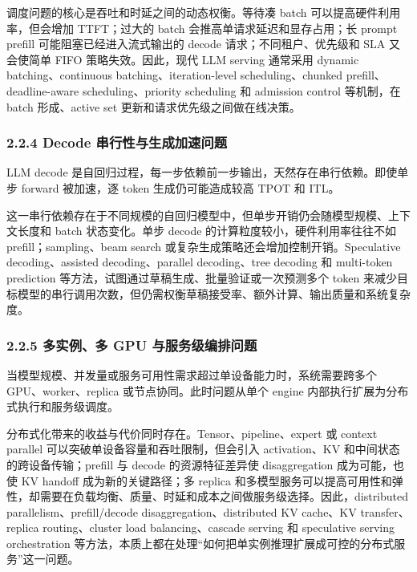 调度问题的核心是吞吐和时延之间的动态权衡。等待凑 batch 可以提高硬件利用率，但会增加 TTFT；过大的 batch 会推高单请求延迟和显存占用；长 prompt prefill 可能阻塞已经进入流式输出的 decode 请求；不同租户、优先级和 SLA 又会使简单 FIFO 策略失效。因此，现代 LLM serving 通常采用 dynamic batching、continuous batching、iteration-level scheduling、chunked prefill、deadline-aware scheduling、priority scheduling 和 admission control 等机制，在 batch 形成、active set 更新和请求优先级之间做在线决策。




\subsubsection*{2.2.4 Decode 串行性与生成加速问题}

LLM decode 是自回归过程，每一步依赖前一步输出，天然存在串行依赖。即使单步 forward 被加速，逐 token 生成仍可能造成较高 TPOT 和 ITL。

这一串行依赖存在于不同规模的自回归模型中，但单步开销仍会随模型规模、上下文长度和 batch 状态变化。单步 decode 的计算粒度较小，硬件利用率往往不如 prefill；sampling、beam search 或复杂生成策略还会增加控制开销。Speculative decoding、assisted decoding、parallel decoding、tree decoding 和 multi-token prediction 等方法，试图通过草稿生成、批量验证或一次预测多个 token 来减少目标模型的串行调用次数，但仍需权衡草稿接受率、额外计算、输出质量和系统复杂度。




\subsubsection*{2.2.5 多实例、多 GPU 与服务级编排问题}

当模型规模、并发量或服务可用性需求超过单设备能力时，系统需要跨多个 GPU、worker、replica 或节点协同。此时问题从单个 engine 内部执行扩展为分布式执行和服务级调度。

分布式化带来的收益与代价同时存在。Tensor、pipeline、expert 或 context parallel 可以突破单设备容量和吞吐限制，但会引入 activation、KV 和中间状态的跨设备传输；prefill 与 decode 的资源特征差异使 disaggregation 成为可能，也使 KV handoff 成为新的关键路径；多 replica 和多模型服务可以提高可用性和弹性，却需要在负载均衡、质量、时延和成本之间做服务级选择。因此，distributed parallelism、prefill/decode disaggregation、distributed KV cache、KV transfer、replica routing、cluster load balancing、cascade serving 和 speculative serving orchestration 等方法，本质上都在处理“如何把单实例推理扩展成可控的分布式服务”这一问题。




